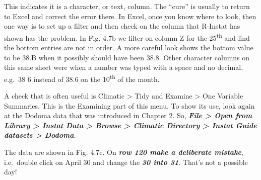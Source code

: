 \documentclass[
  letterpaper,
  DIV=11,
  numbers=noendperiod]{scrreprt}
\begin{document}
This indicates it is a character, or text, column. The ``cure'' is
usually to return to Excel and correct the error there. In Excel, once
you know where to look, then one way is to set up a filter and then
check on the column that R-Instat has shown has the problem. In Fig.
4.7b we filter on column Z for the 25\textsuperscript{th} and find the
bottom entries are not in order. A more careful look shows the bottom
value to be 38.B when it possibly should have been 38.8. Other character
columns on this same sheet were when a number was typed with a space and
no decimal, e.g.~38 6 instead of 38.6 on the 10\textsuperscript{th} of
the month.

A check that is often useful is Climatic \textgreater{} Tidy and Examine
\textgreater{} One Variable Summaries. This is the Examining part of
this menu. To show its use, look again at the Dodoma data that was
introduced in Chapter 2. So, \textbf{\emph{File \textgreater{} Open from
Library \textgreater{} Instat Data \textgreater{} Browse \textgreater{}
Climatic Directory \textgreater{} Instat Guide datasets \textgreater{}
Dodoma}}.

The data are shown in Fig. 4.7c. On \textbf{\emph{row 120 make a
deliberate mistake}}, i.e.~double click on April 30 and change the
\textbf{\emph{30 into 31}}. That's not a possible day!
\end{document}
